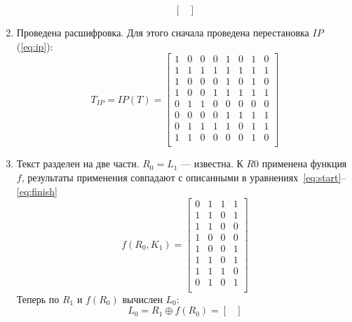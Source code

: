 \documentclass[a4paper, 14pt]{extarticle}
\begin{document}
\begin{enumerate}
\begin{equation}
\begin{bmatrix}
        \end{bmatrix}
    \end{equation}
    \item Проведена расшифровка. Для этого сначала проведена перестановка $IP$ (\ref{eq:ip}):
    \begin{equation}
        T_{IP} = IP(T) = \begin{bmatrix}
            1   & 0   & 0   & 0   & 1   & 0   & 1   & 0   \\
            1   & 1   & 1   & 1   & 1   & 1   & 1   & 1   \\
            1   & 0   & 0   & 0   & 1   & 0   & 1   & 0   \\
            1   & 0   & 0   & 1   & 1   & 1   & 1   & 1   \\
            0   & 1   & 1   & 0   & 0   & 0   & 0   & 0   \\
            0   & 0   & 0   & 0   & 1   & 1   & 1   & 1   \\
            0   & 1   & 1   & 1   & 1   & 0   & 1   & 1   \\
            1   & 1   & 0   & 0   & 0   & 0   & 1   & 0   \\
        \end{bmatrix}
    \end{equation}
    \item Текст разделен на две части. $R_0 = L_1$ --- известна. К $R0$ применена функция $f$, результаты применения совпадают с описанными в уравнениях~\ref{eq:start}--\ref{eq:finish} 
    \begin{equation}
        f(R_0, K_1) = \begin{bmatrix}
            0   & 1   & 1   & 1   \\
            1   & 1   & 0   & 1   \\
            1   & 1   & 0   & 0   \\
            1   & 0   & 0   & 0   \\
            1   & 0   & 0   & 1   \\
            1   & 1   & 0   & 1   \\
            1   & 1   & 1   & 0   \\
            0   & 1   & 0   & 1   \\
        \end{bmatrix}
    \end{equation}
    Теперь по $R_1$ и $f(R_0)$ вычислен $L_0$:
    \begin{equation}
        L_0 = R_1 \oplus f(R_0) = \begin{bmatrix}

\end{bmatrix}
\end{equation}
\end{enumerate}
\end{document}
